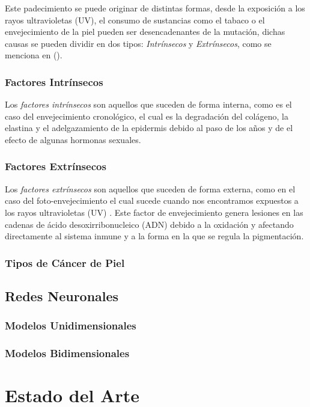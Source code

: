 Este padecimiento se puede originar de distintas formas, desde la exposición a los rayos ultravioletas (UV), el consumo de sustancias como el tabaco o el envejecimiento de la piel pueden ser desencadenantes de la mutación, dichas causas se pueden dividir en dos tipos: \emph{Intrínsecos} y \emph{Extrínsecos}, como se menciona en \citeauthor{skin_1} (\citeyear{skin_1}).

\subsection{Factores Intrínsecos}
Los \emph{factores intrínsecos} son aquellos que suceden de forma interna, como es el caso del envejecimiento cronológico, el cual es la degradación del colágeno, la elastina y el adelgazamiento de la epidermis debido al paso de los años y de el efecto de algunas hormonas sexuales.

\subsection{Factores Extrínsecos}
Los \emph{factores extrínsecos} son aquellos que suceden de forma externa, como en el caso del foto-envejecimiento el cual sucede cuando nos encontramos expuestos a los rayos ultravioletas (UV) \citep{skin_aging}. Este factor de envejecimiento genera lesiones en las cadenas de ácido desoxirribonucleico (ADN) debido a la oxidación y afectando directamente al sistema inmune y a la forma en la que se regula la pigmentación.

\subsection{Tipos de Cáncer de Piel}

\section{Redes Neuronales}
\subsection{Modelos Unidimensionales}
\subsection{Modelos Bidimensionales}

\chapter{Estado del Arte}
